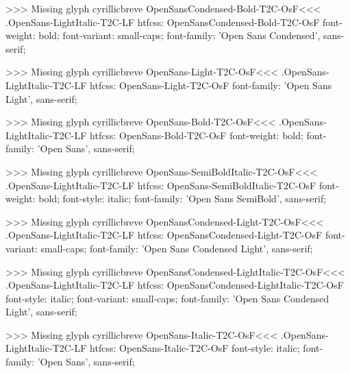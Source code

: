 >>>
Missing glyph	cyrillicbreve
\<OpenSansCondensed-Bold-T2C-OsF\><<<
.OpenSans-LightItalic-T2C-LF
htfcss:  OpenSansCondensed-Bold-T2C-OsF  font-weight: bold; font-variant: small-caps; font-family: 'Open Sans Condensed', sans-serif;

>>>
Missing glyph	cyrillicbreve
\<OpenSans-Light-T2C-OsF\><<<
.OpenSans-LightItalic-T2C-LF
htfcss:  OpenSans-Light-T2C-OsF  font-family: 'Open Sans Light', sans-serif;

>>>
Missing glyph	cyrillicbreve
\<OpenSans-Bold-T2C-OsF\><<<
.OpenSans-LightItalic-T2C-LF
htfcss:  OpenSans-Bold-T2C-OsF  font-weight: bold; font-family: 'Open Sans', sans-serif;

>>>
Missing glyph	cyrillicbreve
\<OpenSans-SemiBoldItalic-T2C-OsF\><<<
.OpenSans-LightItalic-T2C-LF
htfcss:  OpenSans-SemiBoldItalic-T2C-OsF  font-weight: bold; font-style: italic; font-family: 'Open Sans SemiBold', sans-serif;

>>>
Missing glyph	cyrillicbreve
\<OpenSansCondensed-Light-T2C-OsF\><<<
.OpenSans-LightItalic-T2C-LF
htfcss:  OpenSansCondensed-Light-T2C-OsF  font-variant: small-caps; font-family: 'Open Sans Condensed Light', sans-serif;

>>>
Missing glyph	cyrillicbreve
\<OpenSansCondensed-LightItalic-T2C-OsF\><<<
.OpenSans-LightItalic-T2C-LF
htfcss:  OpenSansCondensed-LightItalic-T2C-OsF  font-style: italic; font-variant: small-caps; font-family: 'Open Sans Condensed Light', sans-serif;

>>>
Missing glyph	cyrillicbreve
\<OpenSans-Italic-T2C-OsF\><<<
.OpenSans-LightItalic-T2C-LF
htfcss:  OpenSans-Italic-T2C-OsF  font-style: italic; font-family: 'Open Sans', sans-serif;

